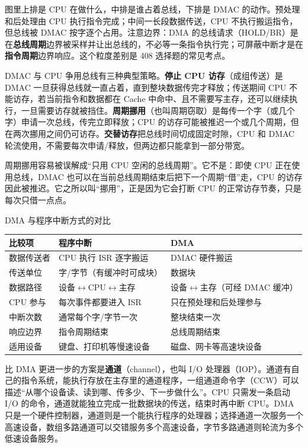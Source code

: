 图里上排是 CPU 在做什么，中排是谁占着总线，下排是 DMAC 的动作。预处理和后处理由 CPU 执行指令完成；中间一长段数据传送，CPU 不执行搬运指令，但总线被 DMAC 按字逐个占用。注意边界：DMA 的总线请求（HOLD/BR）是在\textbf{总线周期}边界被采样并让出总线的，不必等一条指令执行完；可屏蔽中断才是在\textbf{指令周期}边界响应。这个粒度差别是 408 选择题的常见考点。

DMAC 与 CPU 争用总线有三种典型策略。\textbf{停止 CPU 访存}（成组传送）是 DMAC 一旦获得总线就一直占着，直到整块数据传完才释放；传送期间 CPU 不能访存，若当前指令和数据都在 Cache 中命中、且不需要写主存，还可以继续执行，一旦需要访存就被挡住。\textbf{周期挪用}（也叫周期窃取）是每传一个字（或几个字）申请一次总线，传完立即释放；CPU 的访存可能被推迟一个或几个周期，但在两次挪用之间仍可访存。\textbf{交替访存}把总线时间切成固定时隙，CPU 和 DMAC 轮流使用，不需要每次申请/释放，但两边都只能拿到一部分带宽。

周期挪用容易被误解成“只用 CPU 空闲的总线周期”。它不是：即使 CPU 正在使用总线，DMAC 也可以在当前总线周期结束后把下一个周期“借”走，CPU 的访存因此被推迟。它之所以叫“挪用”，正是因为它会打断 CPU 的正常访存节奏，只是每次只借一点点。

\begin{tablebox}{DMA 与程序中断方式的对比}
\centering
\small
\begin{tabularx}{\linewidth}{|p{2.4cm}|X|X|}
\hline
比较项 & 程序中断 & DMA \\
\hline
数据传送者 & CPU 执行 ISR 逐字搬运 & DMAC 硬件搬运 \\
传送单位 & 字/字节（有缓冲时可成块） & 数据块 \\
数据路径 & 设备$\leftrightarrow$CPU$\leftrightarrow$主存 & 设备$\leftrightarrow$主存（可经 DMAC 缓冲） \\
CPU 参与 & 每次事件都要进入 ISR & 只在预处理和后处理参与 \\
中断次数 & 通常每个字/字节一次 & 整块结束一次 \\
响应边界 & 指令周期结束 & 总线周期结束 \\
适用设备 & 键盘、打印机等慢速设备 & 磁盘、网卡等高速块设备 \\
\hline
\end{tabularx}
\end{tablebox}

比 DMA 更进一步的方案是\textbf{通道}（channel），也叫 I/O 处理器（IOP）。通道有自己的指令系统，能执行存放在主存里的通道程序，一组通道命令字（CCW）可以描述“从哪个设备读、读到哪、传多少、下一步做什么”。CPU 只需发一条启动 I/O 的命令，通道就能独立完成一批数据块的传送，结束时再中断 CPU。DMA 只是一个硬件控制器，通道则是一个能执行程序的处理器；选择通道一次服务一个高速设备，数组多路通道可以交错服务多个高速设备，字节多路通道则轮流为多个低速设备服务。

